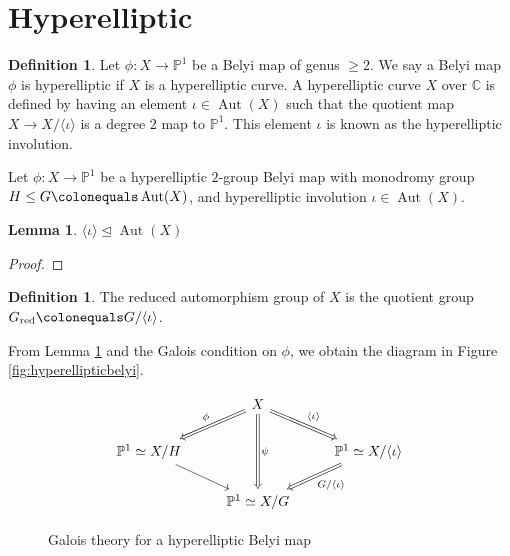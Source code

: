 \documentclass{dcthesis}
\newcommand{\PP}{\mathbb P}
\newcommand{\CC}{\mathbb C}
\newcommand{\defi}[1]{\textsf{#1}}
\DeclareMathOperator{\rred}{red}
\DeclareMathOperator{\Aut}{Aut}
\numberwithin{equation}{section}
\newtheorem{lemma}[equation]{Lemma}
\theoremstyle{definition}
\newtheorem{definition}[equation]{Definition}
\theoremstyle{remark}
\begin{document}
{  \section{Hyperelliptic}{\label{sec:hyperelliptic}
    \begin{definition}\label{def:hyperelliptic}
      Let $\phi\colon X\to\PP^1$ be a Belyi map
      of genus $\geq 2$.
      We say a Belyi map $\phi$ is \defi{hyperelliptic}
      if $X$ is a hyperelliptic curve.
      A hyperelliptic curve $X$ over $\CC$
      is defined by having
      an element $\iota\in\Aut(X)$
      such that
      the quotient map
      $X\to X/\langle\iota\rangle$
      is a degree $2$ map to $\PP^1$.
      This element $\iota$ is known as the
      \defi{hyperelliptic involution}.
    \end{definition}
    Let $\phi\colon X\to\PP^1$ be a hyperelliptic
    $2$-group Belyi map with monodromy group
    $H\leq G\colonequals\Aut(X)$,
    and hyperelliptic involution $\iota\in\Aut(X)$.
    \begin{lemma}\label{lem:hypinvolutioncentral}
      $\langle\iota\rangle\trianglelefteq\Aut(X)$
    \end{lemma}
    \begin{proof}
    \end{proof}
    \begin{definition}\label{def:reducedautomorphismgroup}
      The
      \defi{reduced automorphism group} of $X$
      is the quotient group
      $G_{\rred}\colonequals G/\langle\iota\rangle$.
    \end{definition}
    From Lemma \ref{lem:hypinvolutioncentral}
    and the Galois condition on $\phi$,
    we obtain the diagram in Figure \ref{fig:hyperellipticbelyi}.
    \begin{figure}[ht]
      \[
        \begin{tikzcd}
          &X\arrow[swap, Rightarrow]{dl}{\phi}\arrow[Rightarrow]{dr}{\langle\iota\rangle}
          \arrow[Rightarrow]{dd}{\psi}\\
          \PP^1\simeq X/H\arrow{dr}&&\PP^1\simeq X/\langle\iota\rangle\arrow[Rightarrow]{dl}{G/\langle\iota\rangle}\\
                         &\PP^1\simeq X/G
        \end{tikzcd}
      \]
      \caption{Galois theory for a hyperelliptic Belyi map}

\end{figure}}}
\end{document}
